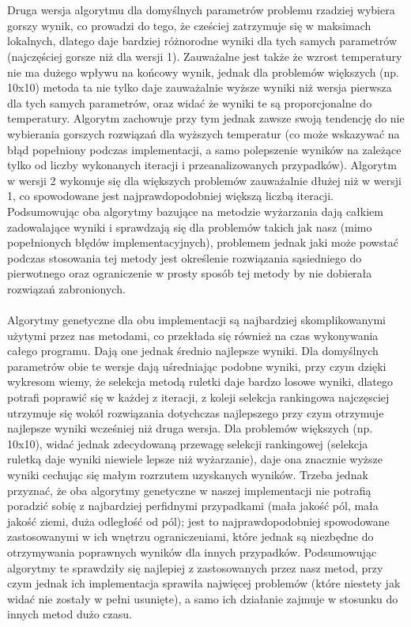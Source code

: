 \documentclass{article}
\begin{document}
\\\\Druga wersja algorytmu dla domyślnych parametrów problemu rzadziej wybiera gorszy wynik, co prowadzi do tego, że cześciej zatrzymuje się w maksimach lokalnych, dlatego daje bardziej różnorodne wyniki dla tych samych parametrów (najczęściej gorsze niż dla wersji 1). Zauważalne jest także że wzrost temperatury nie ma dużego wpływu na końcowy wynik, jednak dla problemów większych (np. 10x10) metoda ta nie tylko daje zauważalnie wyższe wyniki niż wersja pierwsza dla tych samych parametrów, oraz widać że wyniki te są proporcjonalne do temperatury. Algorytm zachowuje przy tym jednak zawsze swoją tendencję do nie wybierania gorszych rozwiązań dla wyższych temperatur (co może wskazywać na błąd popełniony podczas implementacji, a samo polepszenie wyników na zależące tylko od liczby wykonanych iteracji i przeanalizowanych przypadków). Algorytm w wersji 2 wykonuje się dla większych problemów zauważalnie dłużej niż w wersji 1, co spowodowane jest najprawdopodobniej większą liczbą iteracji. Podsumowując oba algorytmy bazujące na metodzie wyżarzania dają całkiem zadowalające wyniki i sprawdzają się dla problemów takich jak nasz (mimo popełnionych błędów implementacyjnych), problemem jednak jaki może powstać podczas stosowania tej metody jest określenie rozwiązania sąsiedniego do pierwotnego oraz ograniczenie w prosty sposób tej metody by nie dobierała rozwiązań zabronionych.
\\\\Algorytmy genetyczne dla obu implementacji są najbardziej skomplikowanymi użytymi przez nas metodami, co przekłada się również na czas wykonywania całego programu. Dają one jednak średnio najlepsze wyniki. Dla domyślnych parametrów obie te wersje dają uśredniając podobne wyniki, przy czym dzięki wykresom wiemy, że selekcja metodą ruletki daje bardzo losowe wyniki, dlatego potrafi poprawić się w każdej z iteracji, z koleji selekcja rankingowa najczęsciej utrzymuje się wokół rozwiązania dotychczas najlepszego przy czym otrzymuje najlepsze wyniki wcześniej niż druga wersja. Dla problemów większych (np. 10x10), widać jednak zdecydowaną przewagę selekcji rankingowej (selekcja ruletką daje wyniki niewiele lepsze niż wyżarzanie), daje ona znacznie wyższe wyniki cechując się małym rozrzutem uzyskanych wyników. Trzeba jednak przyznać, że oba algorytmy genetyczne w naszej implementacji nie potrafią poradzić sobię z najbardziej perfidnymi przypadkami (mała jakość pól, mała jakość ziemi, duża odległość od pól); jest to najprawdopodobniej spowodowane zastosowanymi w ich wnętrzu ograniczeniami, które jednak są niezbędne do otrzymywania poprawnych wyników dla innych przypadków. Podsumowując algorytmy te sprawdziły się najlepiej z zastosowanych przez nasz metod, przy czym jednak ich implementacja sprawiła najwięcej problemów (które niestety jak widać nie zostały w pełni usunięte), a samo ich działanie zajmuje w stosunku do innych metod dużo czasu.
\end{document}
